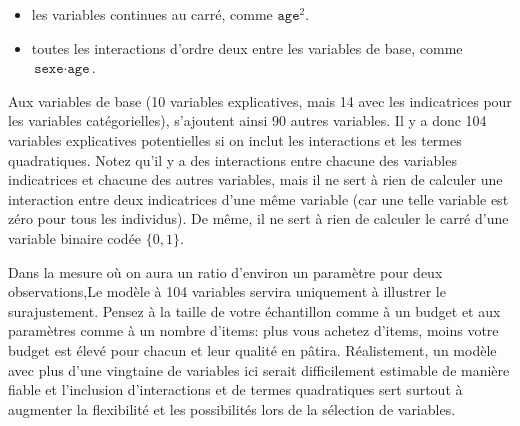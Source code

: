 \documentclass[
  11pt,
  letterpaper,
]{scrbook}
\providecommand{\tightlist}{%
  \setlength{\itemsep}{0pt}\setlength{\parskip}{0pt}}\usepackage{longtable,booktabs,array}
\theoremstyle{definition}
\theoremstyle{remark}
\begin{document}
\begin{itemize}
\tightlist
\item
  les variables continues au carré, comme \(\texttt{age}^2\).
\item
  toutes les interactions d'ordre deux entre les variables de base,
  comme \(\texttt{sexe}\cdot\texttt{age}\).
\end{itemize}

Aux variables de base (10 variables explicatives, mais 14 avec les
indicatrices pour les variables catégorielles), s'ajoutent ainsi 90
autres variables. Il y a donc 104 variables explicatives potentielles si
on inclut les interactions et les termes quadratiques. Notez qu'il y a
des interactions entre chacune des variables indicatrices et chacune des
autres variables, mais il ne sert à rien de calculer une interaction
entre deux indicatrices d'une même variable (car une telle variable est
zéro pour tous les individus). De même, il ne sert à rien de calculer le
carré d'une variable binaire codée \(\{0, 1\}\).

Dans la mesure où on aura un ratio d'environ un paramètre pour deux
observations,Le modèle à 104 variables servira uniquement à illustrer le
surajustement. Pensez à la taille de votre échantillon comme à un budget
et aux paramètres comme à un nombre d'items: plus vous achetez d'items,
moins votre budget est élevé pour chacun et leur qualité en pâtira.
Réalistement, un modèle avec plus d'une vingtaine de variables ici
serait difficilement estimable de manière fiable et l'inclusion
d'interactions et de termes quadratiques sert surtout à augmenter la
flexibilité et les possibilités lors de la sélection de variables.
\end{document}
